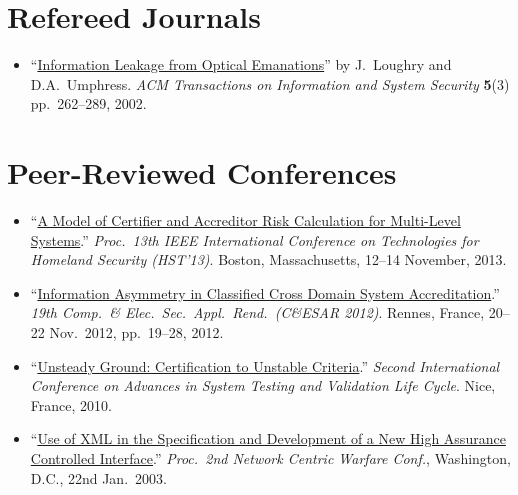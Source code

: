 \documentclass[12pt,twoside,letterpaper]{article}
\begin{document}
\vspace{-8mm}
\section*{Refereed Journals}
\vspace{-2mm}
\begin{itemize}
    \item ``\href{http://dl.acm.org/citation.cfm?doid=545186.545189}{Information
		Leakage from Optical Emanations}'' by J.\ Loughry and D.A.\ Umphress.
		\emph{ACM Transactions on Information and System Security} \textbf{5}(3)
		pp.\ 262--289, 2002.
\end{itemize}

\vspace{-8mm}
\section*{Peer-Reviewed Conferences}
\vspace{-2mm}
\begin{itemize}
	\item ``\href{http://ieee-hst.org/agenda/papers/papers_sched.html#cyber4}{A
		Model of Certifier and Accreditor Risk Calculation for Multi-Level
		Systems}.'' \emph{Proc.\ 13th IEEE International Conference on Technologies
		for Homeland Security (HST'13)}. Boston, Massachusetts, 12--14 November,
		2013.

	\item ``\href{http://applied-math.org/CESAR2012_information_asymmetry.pdf}{Information
		Asymmetry in Classified Cross Domain System Accreditation}.'' \emph{19th
		Comp.\ \& Elec.\ Sec.\ Appl.\ Rend.\ (C\&ESAR 2012)}. Rennes, France,
		20--22 Nov.\ 2012, pp.\ 19--28, 2012.

	\item ``\href{http://ieeexplore.ieee.org/xpls/abs_all.jsp?arnumber=5617171&tag=1}{Unsteady
		Ground: Certification to Unstable Criteria}.'' \emph{Second International Conference
		on Advances in System Testing and Validation Life Cycle}. Nice, France, 2010. 


    \item ``\href{https://docs.google.com/viewer?a=v&q=cache:OjDo4H9Pj10J:citeseerx.ist.psu.edu/viewdoc/download%3Fdoi%3D10.1.1.10.4531%26rep%3Drep1%26type%3Dpdf+&hl=en&gl=uk&pid=bl&srcid=ADGEESgzzne2bVzWsUDU4ITF7lKKcGhA_k51PqkEVB7aiZgGgJ65C9VGGFIDIL2TQ_YUcdDO20UNkw-mnwZN71u0JDy5EYltrpjR_If5ZU8yyXc400Izs9ywtAeLkxHyxd02fNek-mj4&sig=AHIEtbQHRLT1rO3Eft0-P1LmHBrZ7zJL7w}{Use
		of XML in the Specification and Development of a New High Assurance
		Controlled Interface}.'' \emph{Proc.\ 2nd Network Centric Warfare Conf.},
		Washington, D.C., 22nd Jan.\ 2003.
\end{itemize}
\end{document}
